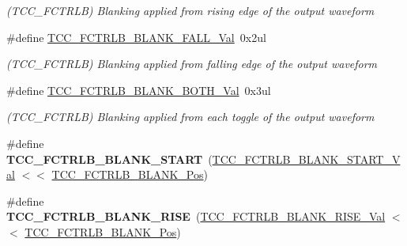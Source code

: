 \begin{DoxyCompactItemize}
\begin{DoxyCompactList}\small\item\em (T\+C\+C\+\_\+\+F\+C\+T\+R\+L\+B) Blanking applied from rising edge of the output waveform \end{DoxyCompactList}\item 
\hypertarget{group___s_a_m_l21___t_c_c_gaeb2f63afa4b722c70140a0316f072ca2}{}\#define \hyperlink{group___s_a_m_l21___t_c_c_gaeb2f63afa4b722c70140a0316f072ca2}{T\+C\+C\+\_\+\+F\+C\+T\+R\+L\+B\+\_\+\+B\+L\+A\+N\+K\+\_\+\+F\+A\+L\+L\+\_\+\+Val}~0x2ul\label{group___s_a_m_l21___t_c_c_gaeb2f63afa4b722c70140a0316f072ca2}

\begin{DoxyCompactList}\small\item\em (T\+C\+C\+\_\+\+F\+C\+T\+R\+L\+B) Blanking applied from falling edge of the output waveform \end{DoxyCompactList}\item 
\hypertarget{group___s_a_m_l21___t_c_c_ga0ff0915f1247161a5fab120d3260ad8b}{}\#define \hyperlink{group___s_a_m_l21___t_c_c_ga0ff0915f1247161a5fab120d3260ad8b}{T\+C\+C\+\_\+\+F\+C\+T\+R\+L\+B\+\_\+\+B\+L\+A\+N\+K\+\_\+\+B\+O\+T\+H\+\_\+\+Val}~0x3ul\label{group___s_a_m_l21___t_c_c_ga0ff0915f1247161a5fab120d3260ad8b}

\begin{DoxyCompactList}\small\item\em (T\+C\+C\+\_\+\+F\+C\+T\+R\+L\+B) Blanking applied from each toggle of the output waveform \end{DoxyCompactList}\item 
\hypertarget{group___s_a_m_l21___t_c_c_ga3c8f0dff307d130b7177d1a9d4d3a72a}{}\#define {\bfseries T\+C\+C\+\_\+\+F\+C\+T\+R\+L\+B\+\_\+\+B\+L\+A\+N\+K\+\_\+\+S\+T\+A\+R\+T}~(\hyperlink{group___s_a_m_l21___t_c_c_gad12042c8eb3b6cd0794646e7650711cd}{T\+C\+C\+\_\+\+F\+C\+T\+R\+L\+B\+\_\+\+B\+L\+A\+N\+K\+\_\+\+S\+T\+A\+R\+T\+\_\+\+Val}    $<$$<$ \hyperlink{group___s_a_m_l21___t_c_c_ga43f50b938e3b7d7d9e7829e9550b855c}{T\+C\+C\+\_\+\+F\+C\+T\+R\+L\+B\+\_\+\+B\+L\+A\+N\+K\+\_\+\+Pos})\label{group___s_a_m_l21___t_c_c_ga3c8f0dff307d130b7177d1a9d4d3a72a}

\item 
\hypertarget{group___s_a_m_l21___t_c_c_ga2507d5fd7632913fa8ebf326c0b3ff06}{}\#define {\bfseries T\+C\+C\+\_\+\+F\+C\+T\+R\+L\+B\+\_\+\+B\+L\+A\+N\+K\+\_\+\+R\+I\+S\+E}~(\hyperlink{group___s_a_m_l21___t_c_c_ga17f2009211f31ab83b9b88230b89d939}{T\+C\+C\+\_\+\+F\+C\+T\+R\+L\+B\+\_\+\+B\+L\+A\+N\+K\+\_\+\+R\+I\+S\+E\+\_\+\+Val}     $<$$<$ \hyperlink{group___s_a_m_l21___t_c_c_ga43f50b938e3b7d7d9e7829e9550b855c}{T\+C\+C\+\_\+\+F\+C\+T\+R\+L\+B\+\_\+\+B\+L\+A\+N\+K\+\_\+\+Pos})\label{group___s_a_m_l21___t_c_c_ga2507d5fd7632913fa8ebf326c0b3ff06}


\end{DoxyCompactItemize}
